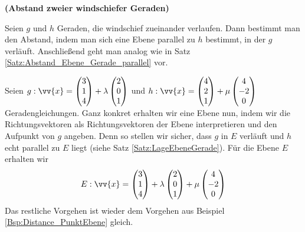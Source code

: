 \documentclass[ngerman, 12pt]{nssheetxea}
\begin{document}
\begin{theorem} \textbf{(Abstand zweier windschiefer Geraden)} \par
Seien $g$ und $h$ Geraden, die windschief zueinander verlaufen. Dann bestimmt man den Abstand, indem man sich eine Ebene parallel zu $h$ bestimmt, in der $g$ verläuft. Anschließend geht man analog wie in Satz \ref{Satz:Abstand_Ebene_Gerade_parallel} vor. 
\begin{center}
\end{center}
\end{theorem}

\begin{example}
Seien $g:\vv{x}=\colvec[3]{1}{4}+\lambda \colvec[2]{0}{1}$ und $h:\vv{x}=\colvec[4]{2}{1}+\mu \colvec[4]{-2}{0}$ Geradengleichungen. Ganz konkret erhalten wir eine Ebene nun, indem wir die Richtungsvektoren als Richtungsvektoren der Ebene interpretieren und den Aufpunkt von $g$ angeben. Denn so stellen wir sicher, dass $g$ in $E$ verläuft und $h$ echt parallel zu $E$ liegt (siehe Satz \ref{Satz:LageEbeneGerade}). Für die Ebene $E$ erhalten wir
\[ E: \vv{x} = \colvec[3]{1}{4} + \lambda \colvec[2]{0}{1} + \mu \colvec[4]{-2}{0}   \]
Das restliche Vorgehen ist wieder dem Vorgehen aus Beispiel \ref{Bsp:Distance_PunktEbene} gleich.
\end{example}
\end{document}
